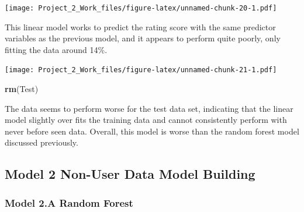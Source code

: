 \documentclass[]{article}
\newenvironment{Shaded}{\begin{snugshade}}{\end{snugshade}}
\newcommand{\KeywordTok}[1]{\textcolor[rgb]{0.13,0.29,0.53}{\textbf{{#1}}}}
\newcommand{\DataTypeTok}[1]{\textcolor[rgb]{0.13,0.29,0.53}{{#1}}}
\newcommand{\DecValTok}[1]{\textcolor[rgb]{0.00,0.00,0.81}{{#1}}}
\newcommand{\StringTok}[1]{\textcolor[rgb]{0.31,0.60,0.02}{{#1}}}
\newcommand{\NormalTok}[1]{{#1}}
\begin{document}
\begin{Shaded}
\end{Shaded}

\texttt{[image: Project\_2\_Work\_files/figure-latex/unnamed-chunk-20-1.pdf]}

This linear model works to predict the rating score with the same
predictor variables as the previous model, and it appears to perform
quite poorly, only fitting the data around 14\%.

\begin{Shaded}
\end{Shaded}

\texttt{[image: Project\_2\_Work\_files/figure-latex/unnamed-chunk-21-1.pdf]}

\begin{Shaded}
\begin{Highlighting}[]
\KeywordTok{rm}\NormalTok{(Test)}
\end{Highlighting}
\end{Shaded}

The data seems to perform worse for the test data set, indicating that
the linear model slightly over fits the training data and cannot
consistently perform with never before seen data. Overall, this model is
worse than the random forest model discussed previously.

\subsection{Model 2 Non-User Data Model
Building}\label{model-2-non-user-data-model-building}

\subsubsection{Model 2.A Random Forest}\label{model-2.a-random-forest}
\end{document}
